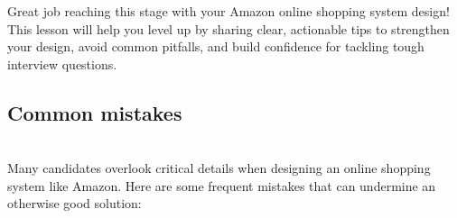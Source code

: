 

Great job reaching this stage with your Amazon online shopping system design! This lesson will help you level up by sharing clear, actionable tips to strengthen your design, avoid common pitfalls, and build confidence for tackling tough interview questions.

\subsection{Common mistakes}\label{sqHzYR2KJoXYQbvf0GYX7}
\\
Many candidates overlook critical details when designing an online shopping system like Amazon. Here are some frequent mistakes that can undermine an otherwise good solution:

